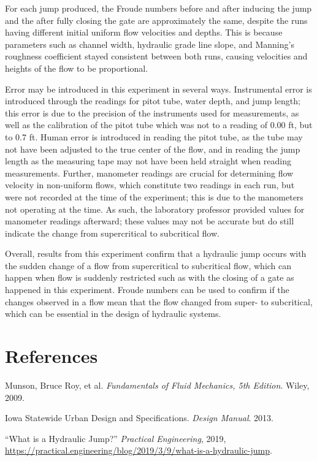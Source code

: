 \documentclass{article}
\begin{document}
\par For each jump produced, the Froude numbers before and after inducing the jump and the after fully closing the gate are approximately the same, despite the runs having different initial uniform flow velocities and depths. This is because parameters such as channel width, hydraulic grade line slope, and Manning's roughness coefficient stayed consistent between both runs, causing velocities and heights of the flow to be proportional. 
\par Error may be introduced in this experiment in several ways. Instrumental error is introduced through the readings for pitot tube, water depth, and jump length; this error is due to the precision of the instruments used for measurements, as well as the calibration of the pitot tube which was not to a reading of 0.00 ft, but to 0.7 ft. Human error is introduced in reading the pitot tube, as the tube may not have been adjusted to the true center of the flow, and in reading the jump length as the measuring tape may not have been held straight when reading measurements. Further, manometer readings are crucial for determining flow velocity in non-uniform flows, which constitute two readings in each run, but were not recorded at the time of the experiment; this is due to the manometers not operating at the time. As such, the laboratory professor provided values for manometer readings afterward; these values may not be accurate but do still indicate the change from supercritical to subcritical flow. 
\par Overall, results from this experiment confirm that a hydraulic jump occurs with the sudden change of a flow from supercritical to subcritical flow, which can happen when flow is suddenly restricted such as with the closing of a gate as happened in this experiment. Froude numbers can be used to confirm if the changes observed in a flow mean that the flow changed from super- to subcritical, which can be essential in the design of hydraulic systems. 


\newpage
\section{References}
\begin{description}
    \item Munson, Bruce Roy, et al. \emph{Fundamentals of Fluid Mechanics, 5th Edition}. Wiley, 2009.  
    \item Iowa Statewide Urban Design and Specifications. \emph{Design Manual}. 2013.
    \item ``What is a Hydraulic Jump?'' \emph{Practical Engineering}, 2019, \url{https://practical.engineering/blog/2019/3/9/what-is-a-hydraulic-jump}.
\end{description}
\newpage
\end{document}
